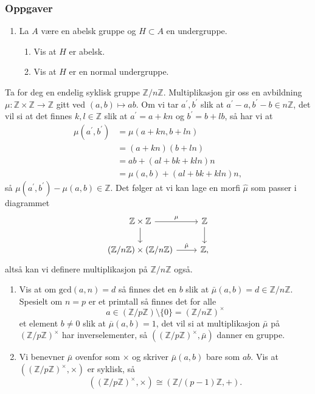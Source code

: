 \subsubsection*{Oppgaver}
\begin{enumerate}
    \item La $A$ være en abelsk gruppe og $H\subset A$ en undergruppe.
        \begin{enumerate}
            \item Vis at $H$ er abelsk.
            \item Vis at $H$ er en normal undergruppe.
        \end{enumerate}
\end{enumerate}
Ta for deg en endelig syklisk gruppe $\mathbb Z / n\mathbb Z$.
Multiplikasjon gir oss en avbildning
$\mu\colon \mathbb Z\times \mathbb Z\to \mathbb Z$
gitt ved $(a,b)\mapsto ab$.
Om vi tar $a^\prime, b^\prime$ slik at
$a^\prime - a, b^\prime - b\in n\mathbb Z$,
det vil si at det finnes $k, l\in \mathbb Z$ slik at
$a^\prime = a + kn$ og $b^\prime = b + lb$,
så har vi at
\[\begin{aligned}
    \mu(a^\prime, b^\prime)
    &= \mu(a + kn, b + ln)
    \\
    &= (a + kn)(b + ln)
    \\
    &= ab + (al + bk + kln)n
    \\
    &= \mu(a, b) + (al + bk + kln)n,
\end{aligned}\]
så $\mu(a^\prime, b^\prime) - \mu(a, b) \in \mathbb Z$.
Det følger at vi kan lage en morfi $\hat\mu$ som passer i diagrammet
\[\begin{tikzcd}
    \mathbb Z\times \mathbb Z
    \rar{\mu}
    \dar
    &
    \mathbb Z
    \dar
    \\
    (\mathbb Z / n\mathbb Z)\times(\mathbb Z / n\mathbb Z)
    \rar{\hat\mu}
    &
    \mathbb Z,
\end{tikzcd}\]
altså kan vi definere multiplikasjon på $\mathbb Z / n\mathbb Z$ også.
\begin{enumerate}[resume]
    \item Vis at om $\mathrm{gcd}(a, n) = d$ så finnes det en
        $b$ slik at $\bar\mu(a, b) = d\in \mathbb Z / n\mathbb Z$.
        Spesielt om $n = p$ er et primtall så finnes det for alle
        \[
            a \in (\mathbb Z / p\mathbb Z)\setminus\{0\}
            = {(\mathbb Z / n\mathbb Z)}^\times
        \]
        et element $b\neq 0$ slik at $\overline\mu(a, b) = 1$,
        det vil si at multiplikasjon $\bar\mu$ på
        ${(\mathbb Z / p\mathbb Z)}^\times$ har inverselementer,
        så $({(\mathbb Z / p\mathbb Z)}^\times, \bar\mu)$ danner en gruppe.
    \item Vi benevner $\bar\mu$ ovenfor som $\times$ og skriver
        $\bar\mu(a,b)$ bare som $ab$.
        Vis at $({(\mathbb Z / p\mathbb Z)}^\times, \times)$ er syklisk,
        så
        \[
            ({(\mathbb Z / p\mathbb Z)}^\times, \times)
            \cong (\mathbb Z / (p - 1)\mathbb Z, +).
        \]
\end{enumerate}
